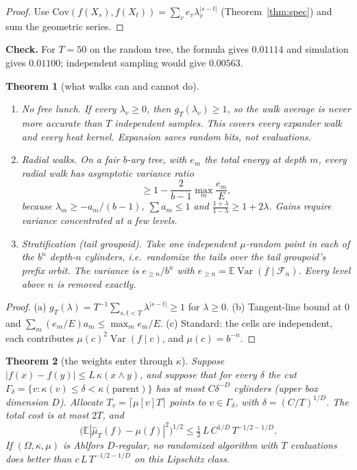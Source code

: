 \documentclass[11pt]{article}
\newtheorem{theorem}{Theorem}[section]
\theoremstyle{definition}
\theoremstyle{remark}
\newcommand{\E}{\mathbb E}
\newcommand{\Var}{\operatorname{Var}}
\begin{document}
\begin{proof}
Use $\mathrm{Cov}(f(X_s),f(X_t))=\sum_ve_v\lambda_v^{|s-t|}$ (Theorem~\ref{thm:spec}) and sum the geometric series.
\end{proof}

\textbf{Check.} For $T=50$ on the random tree, the formula gives $0.01114$ and simulation gives $0.01100$; independent sampling would give $0.00563$.

\begin{theorem}[what walks can and cannot do]\label{thm:nofree}
\begin{enumerate}
\item[(a)] \emph{No free lunch.} If every $\lambda_v\ge0$, then $g_T(\lambda_v)\ge1$, so the walk average is never more accurate than $T$ independent samples. This covers every expander walk and every heat kernel. Expansion saves random bits, not evaluations.
\item[(b)] \emph{Radial walks.} On a fair $b$-ary tree, with $e_m$ the total energy at depth $m$, every radial walk has asymptotic variance ratio
\[\ge1-\frac2{b-1}\max_m\frac{e_m}{E},\]
because $\lambda_m\ge-a_m/(b-1)$, $\sum a_m\le1$ and $\frac{1+\lambda}{1-\lambda}\ge1+2\lambda$. Gains require variance concentrated at a few levels.
\item[(c)] \emph{Stratification (tail groupoid).} Take one independent $\mu$-random point in each of the $b^n$ depth-$n$ cylinders, i.e.\ randomize the tails over the tail groupoid's prefix orbit. The variance is $e_{\ge n}/b^n$ with $e_{\ge n}=\E\Var(f\mid\mathcal F_n)$. Every level above $n$ is removed exactly.
\end{enumerate}
\end{theorem}

\begin{proof}
(a) $g_T(\lambda)=T^{-1}\sum_{s,t<T}\lambda^{|s-t|}\ge1$ for $\lambda\ge0$. (b) Tangent-line bound at $0$ and $\sum_m(e_m/E)a_m\le\max_me_m/E$. (c) Standard: the cells are independent, each contributes $\mu(c)^2\Var(f\mid c)$, and $\mu(c)=b^{-n}$.
\end{proof}

\begin{theorem}[the weights enter through $\kappa$]\label{thm:kappa}
Suppose $|f(x)-f(y)|\le L\,\kappa(x\wedge y)$, and suppose that for every $\delta$ the cut $\Gamma_\delta=\{v:\kappa(v)\le\delta<\kappa(\text{parent})\}$ has at most $C\delta^{-D}$ cylinders (upper box dimension $D$). Allocate $T_v=\lceil\mu[v]T\rceil$ points to $v\in\Gamma_\delta$, with $\delta=(C/T)^{1/D}$. The total cost is at most $2T$, and
\[\big(\E|\hat\mu_T(f)-\mu(f)|^2\big)^{1/2}\le\tfrac12\,L\,C^{1/D}\,T^{-1/2-1/D}.\]
If $(\Omega,\kappa,\mu)$ is Ahlfors $D$-regular, no randomized algorithm with $T$ evaluations does better than $c\,L\,T^{-1/2-1/D}$ on this Lipschitz class.
\end{theorem}
\end{document}
